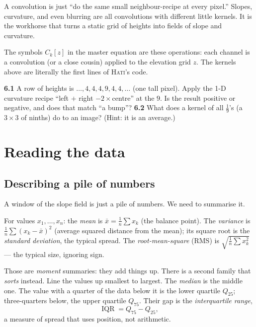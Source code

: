 \documentclass[11pt,oneside]{book}
\begin{document}
\begin{keyidea}
A convolution is just ``do the same small neighbour-recipe at every pixel.'' Slopes,
curvature, and even blurring are all convolutions with different little kernels. It is
the workhorse that turns a static grid of heights into fields of slope and curvature.
\end{keyidea}

\begin{hatibox}
The symbols $C_k[z]$ in the master equation are these operations: each channel is a
convolution (or a close cousin) applied to the elevation grid $z$. The kernels above
are literally the first lines of \textsc{Hati}'s code.
\end{hatibox}

\begin{practice}
\textbf{6.1} A row of heights is $\dots,4,4,4,9,4,4,\dots$ (one tall pixel). Apply the
1-D curvature recipe ``left $+$ right $-2\times$centre'' at the $9$. Is the result
positive or negative, and does that match ``a bump''? \quad\textbf{6.2} What does a
kernel of all $\tfrac19$'s (a $3\times3$ of ninths) do to an image? (Hint: it is an
average.)
\end{practice}

\part{Reading the data}

\chapter{Describing a pile of numbers}

A window of the slope field is just a pile of numbers. We need to summarise it.

\begin{defn}
For values $x_1,\dots,x_n$: the \emph{mean} is $\bar x=\frac1n\sum x_k$ (the balance
point). The \emph{variance} is $\frac1n\sum(x_k-\bar x)^2$ (average squared distance
from the mean); its square root is the \emph{standard deviation}, the typical spread.
The \emph{root-mean-square} (RMS) is $\sqrt{\frac1n\sum x_k^2}$ --- the typical size,
ignoring sign.
\end{defn}

Those are \emph{moment} summaries: they add things up. There is a second family that
\emph{sorts} instead. Line the values up smallest to largest. The \emph{median} is the
middle one. The value with a quarter of the data below it is the lower quartile
$Q_{25}$; three-quarters below, the upper quartile $Q_{75}$. Their gap is the
\emph{interquartile range},
\begin{equation}
\operatorname{IQR}=Q_{75}-Q_{25},
\end{equation}
a measure of spread that uses position, not arithmetic.
\end{document}
